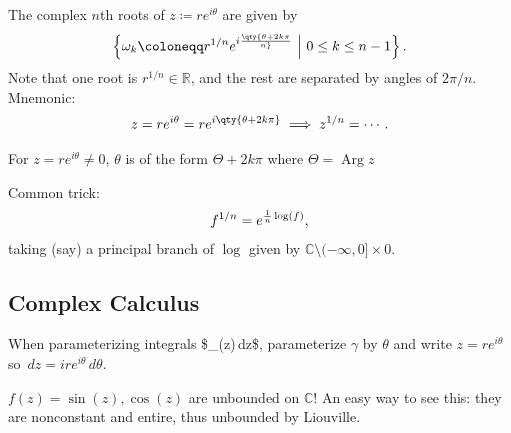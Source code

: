 \begin{fact}

The complex \(n\)th roots of \(z \coloneqq r e^{i\theta}\) are given by
\begin{align*}
\left\{{ \omega_k \coloneqq r^{1/n} e^{i \qty{ \theta + 2k\pi \over n} } {~\mathrel{\Big|}~}0 \leq k \leq n-1 }\right\}
.\end{align*}
Note that one root is \(r^{1/n}\in {\mathbb{R}}\), and the rest are
separated by angles of \(2\pi/n\). Mnemonic:
\begin{align*}
z = re^{i\theta} = re^{i\qty{\theta + 2k\pi}} \implies z^{1/n} = \cdots
.\end{align*}

\end{fact}

\begin{fact}

For \(z= r e^{i\theta}\neq 0\), \(\theta\) is of the form
\(\Theta + 2k\pi\) where \(\Theta = \operatorname{Arg}z\)

\end{fact}

\begin{fact}

Common trick:
\begin{align*}
f^{1/n} = e^{{1\over n} \log(f)}
,\end{align*}
taking (say) a principal branch of \(\log\) given by
\({\mathbb{C}}\setminus(-\infty, 0] \times 0\).

\end{fact}

\hypertarget{complex-calculus}{%
\subsection{Complex Calculus}\label{complex-calculus}}

\begin{remark}

When parameterizing integrals \$\int\_\gammaf(z)\,dz\$, parameterize
\(\gamma\) by \(\theta\) and write \(z=re^{i\theta}\) so
\(\,dz= ire^{i\theta}\,d\theta\).

\end{remark}

\begin{warnings}

\(f(z) = \sin(z), \cos(z)\) are unbounded on \({\mathbb{C}}\)! An easy
way to see this: they are nonconstant and entire, thus unbounded by
Liouville.

\end{warnings}

